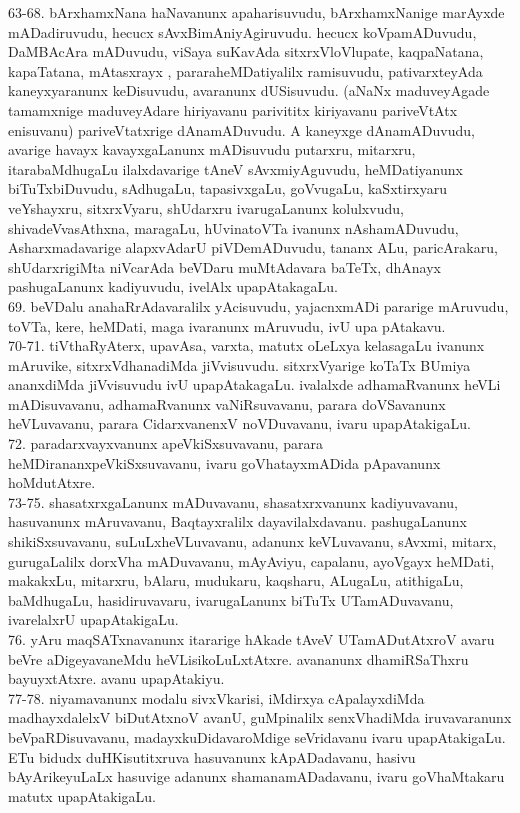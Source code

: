 \documentclass{article}
\begin{document}
63-68. bArxhamxNana haNavanunx apaharisuvudu, bArxhamxNanige marAyxde mADadiruvudu, hecucx sAvxBimAniyAgiruvudu. hecucx koVpamADuvudu, DaMBAcAra mADuvudu, viSaya suKavAda sitxrxVloVlupate, kaqpaNatana, kapaTatana, mAtasxrayx , pararaheMDatiyalilx ramisuvudu, pativarxteyAda kaneyxyaranunx keDisuvudu, avaranunx dUSisuvudu. (aNaNx maduveyAgade tamamxnige maduveyAdare hiriyavanu parivititx kiriyavanu pariveVtAtx enisuvanu) pariveVtatxrige dAnamADuvudu. A kaneyxge dAnamADuvudu, avarige havayx kavayxgaLanunx mADisuvudu putarxru, mitarxru, itarabaMdhugaLu ilalxdavarige tAneV sAvxmiyAguvudu, heMDatiyanunx biTuTxbiDuvudu, sAdhugaLu, tapasivxgaLu, goVvugaLu, kaSxtirxyaru veYshayxru, sitxrxVyaru, shUdarxru ivarugaLanunx kolulxvudu, shivadeVvasAthxna, maragaLu, hUvinatoVTa ivanunx nAshamADuvudu, Asharxmadavarige alapxvAdarU piVDemADuvudu, tananx ALu, paricArakaru, shUdarxrigiMta niVcarAda beVDaru muMtAdavara baTeTx, dhAnayx pashugaLanunx kadiyuvudu, ivelAlx upapAtakagaLu.\\
69. beVDalu anahaRrAdavaralilx yAcisuvudu, yajacnxmADi pararige mAruvudu, toVTa, kere, heMDati, maga ivaranunx mAruvudu, ivU upa pAtakavu.\\
70-71. tiVthaRyAterx, upavAsa, varxta, matutx oLeLxya kelasagaLu ivanunx mAruvike, sitxrxVdhanadiMda jiVvisuvudu. sitxrxVyarige koTaTx BUmiya ananxdiMda jiVvisuvudu ivU upapAtakagaLu. ivalalxde adhamaRvanunx heVLi mADisuvavanu, adhamaRvanunx vaNiRsuvavanu, parara doVSavanunx heVLuvavanu, parara CidarxvanenxV noVDuvavanu, ivaru upapAtakigaLu.\\
72. paradarxvayxvanunx apeVkiSxsuvavanu, parara heMDirananxpeVkiSxsuvavanu, ivaru goVhatayxmADida pApavanunx hoMdutAtxre.\\
73-75. shasatxrxgaLanunx mADuvavanu, shasatxrxvanunx kadiyuvavanu, hasuvanunx mAruvavanu, Baqtayxralilx dayavilalxdavanu. pashugaLanunx shikiSxsuvavanu, suLuLxheVLuvavanu, adanunx keVLuvavanu, sAvxmi, mitarx, gurugaLalilx dorxVha mADuvavanu, mAyAviyu, capalanu, ayoVgayx heMDati, makakxLu, mitarxru, bAlaru, mudukaru, kaqsharu, ALugaLu, atithigaLu, baMdhugaLu, hasidiruvavaru, ivarugaLanunx biTuTx UTamADuvavanu, ivarelalxrU upapAtakigaLu.\\
76. yAru maqSATxnavanunx itararige hAkade tAveV UTamADutAtxroV avaru beVre aDigeyavaneMdu heVLisikoLuLxtAtxre. avananunx dhamiRSaThxru bayuyxtAtxre. avanu upapAtakiyu.\\
77-78. niyamavanunx modalu sivxVkarisi, iMdirxya cApalayxdiMda madhayxdalelxV biDutAtxnoV avanU, guMpinalilx senxVhadiMda iruvavaranunx beVpaRDisuvavanu, madayxkuDidavaroMdige seVridavanu ivaru upapAtakigaLu. ETu bidudx duHKisutitxruva hasuvanunx kApADadavanu, hasivu bAyArikeyuLaLx hasuvige adanunx shamanamADadavanu, ivaru goVhaMtakaru matutx upapAtakigaLu.\\
\end{document}
